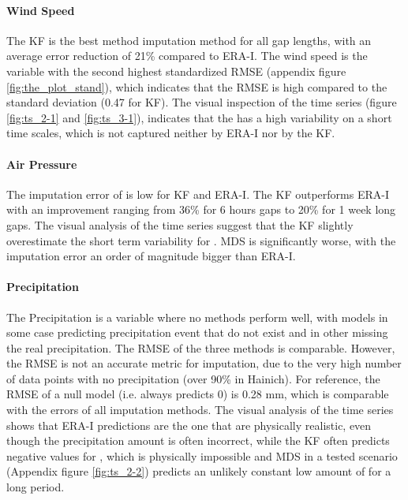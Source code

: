\documentclass{article}
\begin{document}
\paragraph{Wind Speed} The KF is the best method imputation method for all gap lengths, with an average error reduction of 21\% compared to ERA-I. The wind speed is the variable with the second highest standardized RMSE (appendix figure \ref{fig:the_plot_stand}), which indicates that the RMSE is high compared to the  standard deviation (0.47 for KF). The visual inspection of the time series (figure \ref{fig:ts_2-1} and \ref{fig:ts_3-1}), indicates that the  has a high variability on a short time scales, which is not captured neither by ERA-I nor by the KF.

\paragraph{Air Pressure} The imputation error of  is low for KF and ERA-I. The KF outperforms ERA-I with an improvement ranging from 36\% for 6 hours gaps to 20\% for 1 week long gaps. The visual analysis of the time series suggest that the KF slightly overestimate the short term variability for . MDS is significantly worse, with the imputation error an order of magnitude bigger than ERA-I.

\paragraph{Precipitation} The Precipitation is a variable where no methods perform well, with models in some case predicting precipitation event that do not exist and in other missing the real precipitation. The RMSE of the three methods is comparable. However, the RMSE is not an accurate metric for  imputation, due to the very high number of data points with no precipitation (over 90\% in Hainich). For reference, the RMSE of a null model (i.e. always predicts 0) is 0.28 \si{mm}, which is comparable with the errors of all imputation methods. 
The visual analysis of the time series shows that ERA-I predictions are the one that are physically realistic, even though the precipitation amount is often incorrect, while the KF often predicts negative values for , which is physically impossible and MDS in a tested scenario (Appendix figure \ref{fig:ts_2-2}) predicts an unlikely constant low amount of  for a long period.
\end{document}

